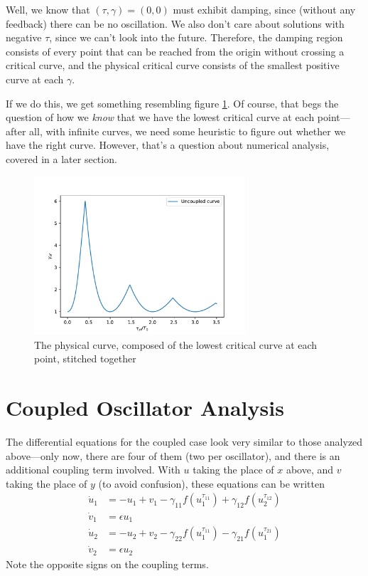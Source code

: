 \documentclass{article}
\begin{document}
    Well, we know that $(\tau, \gamma) = (0,0)$ must exhibit damping, since (without any feedback) there can be no oscillation. We also don't care about solutions with negative $\tau$, since we can't look into the future. Therefore, the damping region consists of every point that can be reached from the origin without crossing a critical curve, and the physical critical curve consists of the smallest positive curve at each $\gamma$. 

    If we do this, we get something resembling figure \ref{physcrit}. Of course, that begs the question of how we \emph{know} that we have the lowest critical curve at each point---after all, with infinite curves, we need some heuristic to figure out whether we have the right curve. However, that's a question about numerical analysis, covered in a later section.

    \begin{figure}[ht]
        \centering
        \includegraphics[width=0.7\textwidth]{figs/physical_critical.pdf}
        \caption{The physical curve, composed of the lowest critical curve at each point, stitched together}
        \label{physcrit}
    \end{figure}

    \section{Coupled Oscillator Analysis}

    The differential equations for the coupled case look very similar to those analyzed above---only now, there are four of them (two per oscillator), and there is an additional coupling term involved. With $u$ taking the place of $x$ above, and $v$ taking the place of $y$ (to avoid confusion), these equations can be written
    \begin{align*}
        \dot{u}_1 &= -u_1 + v_1 - \gamma_{11}f(u_{1}^{\tau_{11}}) + \gamma_{12}f(u_{2}^{\tau_{12}}) \\
        \dot{v}_1 &= \epsilon u_1 \\
        \dot{u}_2 &= -u_2 + v_2 - \gamma_{22}f(u_{1}^{\tau_{11}}) - \gamma_{21}f(u_{1}^{\tau_{21}}) \\
        \dot{v}_2 &= \epsilon u_2
    \end{align*}
    Note the opposite signs on the coupling terms.
    
\end{document}
